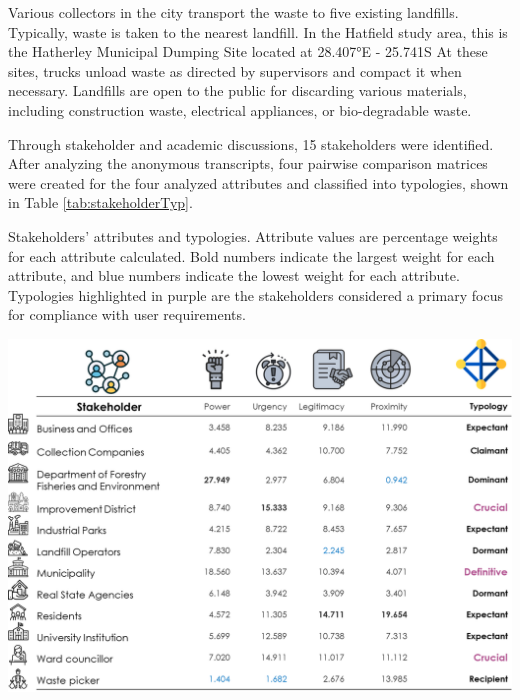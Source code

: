 \documentclass[authoryear,preprint,review,11pt,doubleblind]{elsarticle}
\begin{document}
Various collectors in the city transport the waste to five existing landfills. Typically, waste is taken to the nearest landfill. In the Hatfield study area, this is the Hatherley Municipal Dumping Site located at 28.407°E - 25.741S %
At these sites, trucks unload waste as directed by supervisors and compact it when necessary. Landfills are open to the public for discarding various materials, including construction waste, electrical appliances, or bio-degradable waste.



    Through stakeholder and academic discussions, 15 stakeholders were identified. After analyzing the anonymous transcripts, four pairwise comparison matrices were created for the four analyzed attributes and classified into typologies, shown in Table \ref{tab:stakeholderTyp}. %

    \begin{table}[h!]
    \centering
        \caption{Stakeholders' attributes and typologies. Attribute values are percentage weights for each attribute calculated. Bold numbers indicate the largest weight for each attribute, and blue numbers indicate the lowest weight for each attribute. Typologies highlighted in purple are the stakeholders considered a primary focus for compliance with user requirements.}
        \includegraphics[width=\linewidth]{Figures/stakeholders Result.png}
        \label{tab:stakeholderTyp}    
    \end{table}
   
\end{document}
